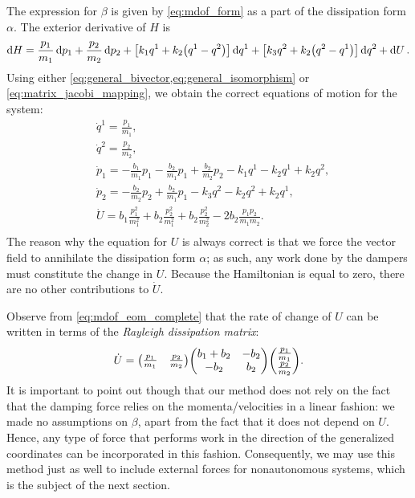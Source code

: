  The expression for \(\beta\) is given by \cref{eq:mdof_form} as a part of the dissipation form \(\alpha\). The exterior derivative of \(H\) is 
     \begin{equation}
     \dd{H} = \frac{p_1}{m_1}\dd{p_1} + \frac{p_2}{m_2}\dd{p_2} +  \qty[k_1q^1 + k_2\qty(q^1 - q^2)]\dd{q^1} + \qty[k_3q^2 + k_2\qty(q^2 - q^1)]\dd{q^2} + \dd{U}.
\end{equation}
 Using either \cref{eq:general_bivector,eq:general_isomorphism} or \cref{eq:matrix_jacobi_mapping}, we obtain the correct equations of motion for the system:
 \begin{equation}
     \begin{split}
         &\dot{q}^1 = \frac{p_1}{m_1}, \\
         &\dot{q}^2 = \frac{p_2}{m_2}, \\
         &\dot{p}_1 = -\frac{b_1}{m_1}p_1 - \frac{b_2}{m_1}p_1 + \frac{b_2}{m_2}p_2 - k_1 q^1 - k_2 q^1 + k_2 q^2, \\
         &\dot{p}_2 =  - \frac{b_2}{m_2}p_2 + \frac{b_2}{m_1}p_1 - k_3 q^2 - k_2 q^2 + k_2 q^1, \\
         &\dot{U} = b_1\frac{p_1^2}{m_1^2} + b_2\frac{p_2^2}{m_1^2} +  b_2\frac{p_2^2}{m_2^2} - 2b_2 \frac{p_1 p_2}{m_1 m_2}. \\
     \end{split}
     \label{eq:mdof_eom_complete}
 \end{equation}
The reason why the equation for \(U\) is always correct is that we force the vector field to annihilate the dissipation form \(\alpha\); as such, any work done by the dampers must constitute the change in \(U\). Because the Hamiltonian is equal to zero, there are no other contributions to \(\dot{U}\). 

Observe from \cref{eq:mdof_eom_complete} that the rate of change of \(U\) can be written in terms of the \emph{Rayleigh dissipation matrix}:
\begin{equation}
     \dot{U} = \mqty(\tfrac{p_1}{m_1} & \tfrac{p_2}{m_2}) \mqty(b_1 + b_2 & -b_2 \\ -b_2 & b_2) \mqty(\tfrac{p_1}{m_1} \\ \tfrac{p_2}{m_2}).
\end{equation}
It is important to point out though that our method does not rely on the fact that the damping force relies on the momenta/velocities in a linear fashion: we made no assumptions on \(\beta\), apart from the fact that it does not depend on \(U\). Hence, any type of force that performs work in the direction of the generalized coordinates can be incorporated in this fashion. Consequently, we may use this method just as well to include external forces for nonautonomous systems, which is the subject of the next section.

